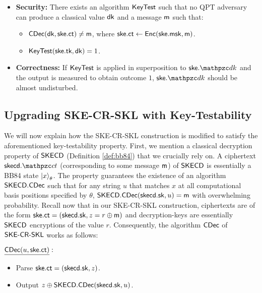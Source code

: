 
\begin{itemize}

\item \textbf{Security:} There exists an algorithm $\mathsf{KeyTest}$ such
that no QPT adversary can produce a classical value $\mathsf{dk}$ and a message
$\mathsf{m}$ such that:
\begin{itemize}
\item $\mathsf{CDec}(\mathsf{dk}, \mathsf{ske}.\mathsf{ct}) \neq \mathsf{m}$, where $\mathsf{ske}.\mathsf{ct} \leftarrow
\mathsf{Enc}(\mathsf{ske}.\mathsf{msk}, \mathsf{m})$.
\item $\mathsf{KeyTest}(\mathsf{ske}.\mathsf{tk}, \mathsf{dk}) = 1$.
\end{itemize}

\item \textbf{Correctness:} 
If $\mathsf{KeyTest}$ is applied in superposition to $\ske.\qdk$ and the output is
measured to obtain outcome $1$, $\ske.\qdk$ should be almost
undisturbed.
\end{itemize}


\subsection{Upgrading SKE-CR-SKL with Key-Testability}

We will now explain how the SKE-CR-SKL construction is modified to
satisfy the aforementioned key-testability property. First, we mention
a classical decryption property of $\mathsf{SKECD}$ (Definition
\ref{def:bb84}) that we crucially rely on. A ciphertext $\skecd.\qct$
(corresponding to some message $\mathsf{m}$) of $\mathsf{SKECD}$ is essentially a
BB84 state $\ket{x}_\theta$. The property guarantees the existence of
an algorithm $\mathsf{SKECD}.\mathsf{CDec}$ such that for any string $u$ that matches
$x$ at all computational basis positions specified by $\theta$,
$\mathsf{SKECD}.\mathsf{CDec}(\mathsf{skecd}.\mathsf{sk}, u) = \mathsf{m}$ with overwhelming probability.
Recall now that in our SKE-CR-SKL construction, ciphertexts are of the
form $\mathsf{ske}.\mathsf{ct} = (\mathsf{skecd}.\mathsf{sk}, z = r \oplus \mathsf{m})$ and decryption-keys
are essentially $\mathsf{SKECD}$ encryptions of the value $r$. Consequently,
the algorithm $\mathsf{CDec}$ of $\mathsf{SKE}\textrm{-}\mathsf{CR}\textrm{-}\mathsf{SKL}$ works as follows:

\begin{description}
\item $\underline{\mathsf{CDec}(u, \mathsf{ske}.\mathsf{ct})}:$
\begin{itemize}
\item Parse $\mathsf{ske}.\mathsf{ct} = (\mathsf{skecd}.\mathsf{sk}, z)$.
\item Output $z \oplus \mathsf{SKECD}.\mathsf{CDec}(\mathsf{skecd}.\mathsf{sk}, u)$.
\end{itemize}
\end{description}


